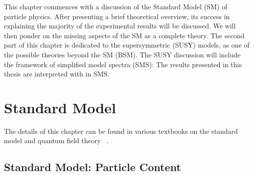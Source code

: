 This chapter commences with a discussion of the Standard Model (SM) of particle physics. After presenting a brief theoretical overview, its success in explaining the majority of the experimental results will be discussed. We will then ponder on the missing aspects of the SM as a complete theory. The second part of this chapter is dedicated to the supersymmetric (SUSY) models, as one of the possible theories beyond the SM (BSM). The SUSY discussion will include the framework of simplified model spectra (SMS): The results presented in this thesis are interpreted with in SMS.
\section{Standard Model}
\label{sec:StandardModel}
The details of this chapter can be found in various textbooks on the standard model and quantum field theory ~\cite{SM1,SM2,SM3}. 
\subsection{Standard Model: Particle Content}
\label{sec:StandardModelParticleContent}


